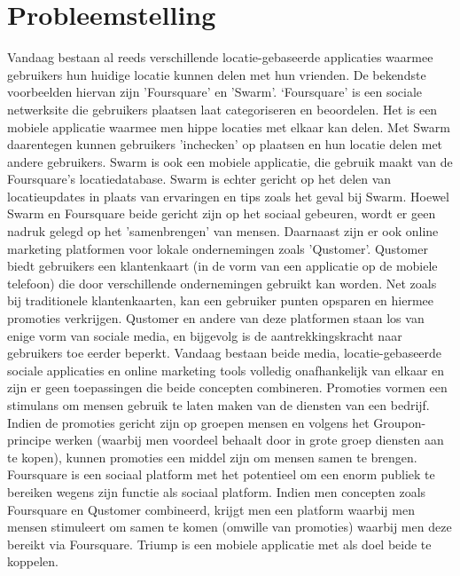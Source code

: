\chapter{Probleemstelling}
Vandaag bestaan al reeds verschillende locatie-gebaseerde applicaties waarmee gebruikers hun huidige locatie kunnen delen met hun vrienden. De bekendste voorbeelden hiervan zijn 'Foursquare' en 'Swarm'. ‘Foursquare’ is een sociale netwerksite die gebruikers plaatsen laat categoriseren en beoordelen. Het is een mobiele applicatie waarmee men hippe locaties met elkaar kan delen. Met Swarm daarentegen kunnen gebruikers 'inchecken' op plaatsen en hun locatie delen met andere gebruikers. Swarm is ook een mobiele applicatie, die gebruik maakt van de Foursquare's locatiedatabase. Swarm is echter gericht op het delen van locatieupdates in plaats van ervaringen en tips zoals het geval bij Swarm.
Hoewel Swarm en Foursquare beide gericht zijn op het sociaal gebeuren, wordt er geen nadruk gelegd op het 'samenbrengen' van mensen. 
Daarnaast zijn er ook online marketing platformen voor lokale ondernemingen zoals 'Qustomer'. Qustomer biedt gebruikers een klantenkaart (in de vorm van een applicatie op de mobiele telefoon) die door verschillende ondernemingen gebruikt kan worden. Net zoals bij traditionele klantenkaarten, kan een gebruiker punten opsparen en hiermee promoties verkrijgen. Qustomer en andere van deze platformen staan los van enige vorm van sociale media, en bijgevolg is de aantrekkingskracht naar gebruikers toe eerder beperkt.
Vandaag bestaan beide media, locatie-gebaseerde sociale applicaties en online marketing tools volledig onafhankelijk van elkaar en zijn er geen toepassingen die beide concepten combineren. 
Promoties vormen een stimulans om mensen gebruik te laten maken van de diensten van een bedrijf. Indien de promoties gericht zijn op groepen mensen en volgens het Groupon-principe werken (waarbij men voordeel behaalt door in grote groep diensten aan te kopen), kunnen promoties een middel zijn om mensen samen te brengen.
Foursquare is een sociaal platform met het potentieel om een enorm publiek te bereiken wegens zijn functie als sociaal platform.
Indien men concepten zoals Foursquare en Qustomer combineerd, krijgt men een platform waarbij men mensen stimuleert om samen te komen (omwille van promoties) waarbij men deze bereikt via Foursquare.
Triump is een mobiele applicatie met als doel beide te koppelen. 



